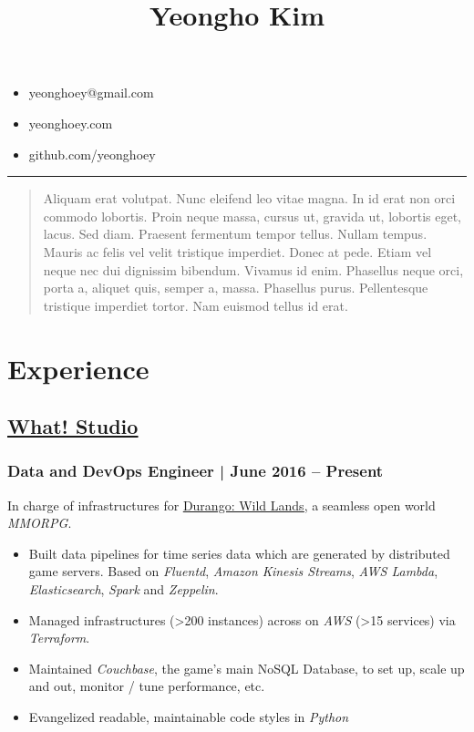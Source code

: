 \documentclass[11pt]{article}
\date{}
\title{Yeongho Kim}
\begin{document}
\maketitle
\begin{itemize}[label=\null,itemsep=-1ex]
\item yeonghoey@gmail.com
\item yeonghoey.com
\item github.com/yeonghoey
\end{itemize}

\noindent\rule{\textwidth}{0.5pt}

\begin{quote}
Aliquam erat volutpat.  Nunc eleifend leo vitae magna.  In id erat non orci commodo lobortis.  Proin neque massa, cursus ut, gravida ut, lobortis eget, lacus.  Sed diam.  Praesent fermentum tempor tellus.  Nullam tempus.  Mauris ac felis vel velit tristique imperdiet.  Donec at pede.  Etiam vel neque nec dui dignissim bibendum.  Vivamus id enim.  Phasellus neque orci, porta a, aliquet quis, semper a, massa.  Phasellus purus.  Pellentesque tristique imperdiet tortor.  Nam euismod tellus id erat.
\end{quote}


\newpage

\section*{Experience}
\label{sec:org5dff189}
\subsection*{\underline{\href{https://github.com/what-studio}{What! Studio}}}
\label{sec:orge076103}
\subsubsection*{Data and DevOps Engineer | June 2016 – Present}
\label{sec:orga945d0d}
In charge of infrastructures for \uline{\href{https://durango.nexon.com/en}{Durango: Wild Lands}}, a seamless open world \emph{MMORPG}.

\begin{itemize}
\item Built data pipelines for time series data which are generated by distributed game servers. Based on
\emph{Fluentd}, \emph{Amazon Kinesis Streams}, \emph{AWS Lambda}, \emph{Elasticsearch}, \emph{Spark} and \emph{Zeppelin}.
\item Managed infrastructures (>200 instances) across on \emph{AWS} (>15 services) via \emph{Terraform}.
\item Maintained \emph{Couchbase}, the game's main NoSQL Database, to set up, scale up and out,  monitor / tune performance, etc.
\item Evangelized readable, maintainable code styles in \emph{Python}
\end{itemize}
\end{document}

